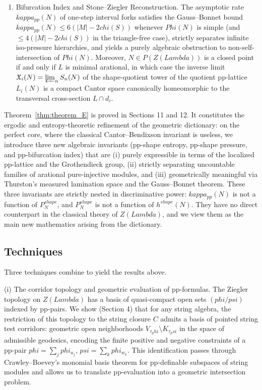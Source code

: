 \documentclass[11pt,a4paper,reqno]{amsart}
\def\mathcal#1{#1}%
\def\mathrm#1{#1}%
\def\operatorname#1{#1}%
\def\Zg{Z}%
\def\kappa{kappa}%
\def\phi{phi}%
\def\psi{psi}%
\def\chi{chi}%
\def\Phi{Phi}%
\def\Lambda{Lambda}%
\def\emph#1{#1}%
\def\textbf#1{#1}%
\theoremstyle{definition}
\theoremstyle{remark}
\newcommand{\Zg}{\operatorname{Zg}}
\begin{document}
{\begin{enumerate}[label=(\arabic*), leftmargin=*]
\item \textbf{Bifurcation Index and Stone--Ziegler Reconstruction.} The asymptotic rate $\kappa_{\mathrm{pp}}(N)$ of one-step interval forks satisfies the Gauss--Bonnet bound $\kappa_{\mathrm{pp}}(N) \le 6(|\mathcal{M}| - 2\chi(\mathcal{S}))$ whenever $\Phi(N)$ is simple (and $\le 4(|\mathcal{M}| - 2\chi(\mathcal{S}))$ in the triangle-free case), strictly separates infinite iso-pressure hierarchies, and yields a purely algebraic obstruction to non-self-intersection of $\Phi(N)$. Moreover, $N \in \mathcal{P}(\Zg(\Lambda))$ is a closed point if and only if $\mathcal{L}$ is minimal arational, in which case the inverse limit $\mathfrak{X}_i(N) = \varprojlim_n \mathcal{S}_n(N)$ of the shape-quotient tower of the quotient pp-lattice $\mathcal{L}_i(N)$ is a compact Cantor space canonically homeomorphic to the transversal cross-section $\mathcal{L} \cap d_i$.
\end{enumerate}}

\smallskip
Theorem~\ref{thm:theorem_E} is proved in Sections 11 and 12. It constitutes the ergodic and entropy-theoretic refinement of the geometric dictionary: on the perfect core, where the classical Cantor--Bendixson invariant is useless, we introduce three new algebraic invariants (pp-shape entropy, pp-shape pressure, and pp-bifurcation index) that are (i) purely expressible in terms of the localized pp-lattice and the Grothendieck group, (ii) strictly separating uncountable families of arational pure-injective modules, and (iii) geometrically meaningful via Thurston's measured lamination space and the Gauss--Bonnet theorem. These three invariants are \emph{strictly nested} in discriminative power: $\kappa_{\mathrm{pp}}(N)$ is not a function of $P^{\mathrm{shape}}_N$, and $P^{\mathrm{shape}}_N$ is not a function of $h^{\mathrm{shape}}(N)$. They have no direct counterpart in the classical theory of $\Zg(\Lambda)$, and we view them as the main \emph{new mathematics} arising from the dictionary.

\subsection{Techniques}
\label{subsec:techniques}

Three techniques combine to yield the results above.

\smallskip
\noindent\textbf{(i) The corridor topology and geometric evaluation of pp-formulas.} The Ziegler topology on $\Zg(\Lambda)$ has a basis of quasi-compact open sets $(\phi/\psi)$ indexed by pp-pairs. We show (Section 4) that for any string algebra, the restriction of this topology to the string closure $C$ admits a basis of \emph{pointed string test corridors}: geometric open neighborhoods $V_{\tau_\phi} \setminus K_{\tau_\psi}$ in the space of admissible geodesics, encoding the finite positive and negative constraints of a pp-pair $\phi = \sum_j \phi_{u_j}$, $\psi = \sum_k \phi_{w_k}$. This identification passes through Crawley--Boevey's monomial basis theorem for pp-definable subspaces of string modules \cite{CrawleyBoevey1989} and allows us to translate pp-evaluation into a geometric intersection problem.
\end{document}

